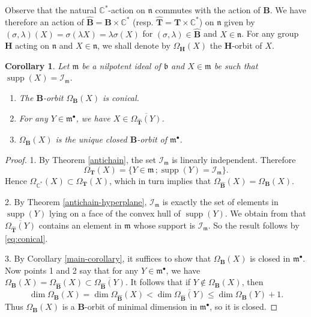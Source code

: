 \documentclass{amsart}
\newtheorem{corollary}[theorem]{Corollary}
\theoremstyle{definition}
\theoremstyle{remark}
\numberwithin{equation}{section}
\newcommand{\supp}{\mathop{\mathrm{supp}}\nolimits}
\newcommand{\soc}[1]{\mathcal{I}_{#1}}
\newcommand{\group}[1]{\mathbf{#1}}
\begin{document}
Observe that the natural $\mathbb{C}^{*}$-action on $\mathfrak{n}$
commutes with the action of $\group{B}$. We have therefore an action of 
$\widehat{\group{B}} = \group{B} \times \mathbb{C}^{*}$ 
(resp. $\widehat{\group{T}} = \group{T} \times \mathbb{C}^{*}$) 
on $\mathfrak{n}$ given by 
$(\sigma, \lambda ) (X) = \sigma (\lambda X) = \lambda \sigma (X)$
for $(\sigma, \lambda )\in \widehat{\group{B}}$ and $X\in\mathfrak{n}$.
For any group $\group{H}$ acting on $\mathfrak{n}$ and $X\in\mathfrak{n}$,
we shall denote by $\Omega_{\group{H}}(X)$ the $\group{H}$-orbit of $X$.

\begin{corollary}\label{description}
Let $\mathfrak{m}$ be a nilpotent ideal of $\mathfrak{b}$ and 
$X\in \mathfrak{m}$ be such that $\supp (X) = \soc{\mathfrak{m}}$.
\begin{enumerate}
\item The $\group{B}$-orbit $\Omega_{\group{B}}(X)$ is conical.
\item For any $Y\in\mathfrak{m}^{\bullet}$, we have
$X \in \overline{\Omega_{\widehat{\group{T}}} (Y)}$.
\item $\Omega_{\group{B}}(X)$ is the unique closed $\group{B}$-orbit of $\mathfrak{m}^{\bullet}$.
\end{enumerate}
\end{corollary}
\begin{proof}
1. By Theorem \ref{antichain}, the set $\soc{\mathfrak{m}}$ is linearly independent.
Therefore 
\begin{equation}\label{eq:conical}
\Omega_{\group{T}}(X) = \{ Y \in \mathfrak{m}\, ; \supp (Y) = \soc{\mathfrak{m}}\}.
\end{equation}
Hence $\Omega_{\mathbb{C}^{*}}( X )\subset \Omega_{\group{T}}(X)$, which in turn implies that 
$\Omega_{\widehat{\group{B}}} (X) = \Omega_{\group{B}}(X)$. 

2. By Theorem \ref{antichain-hyperplane}, $\soc{\mathfrak{m}}$ is exactly the set of elements in
$\supp (Y)$ lying on a face of the convex hull
of $\supp (Y)$. We obtain from \cite[Proposition 2.18]{C} that 
$\overline{\Omega_{\widehat{\group{T}}} (Y)}$ contains
an element in $\mathfrak{m}$ whose support is $\soc{\mathfrak{m}}$. 
So the result follows by \eqref{eq:conical}.

3. By Corollary \ref{main-corollary}, it suffices to show that $\Omega_{\group{B}} (X)$ is closed in 
$\mathfrak{m}^{\bullet}$. Now points 1 and 2 say that for any $Y\in\mathfrak{m}^{\bullet}$, we have
$
\Omega_{\group{B}}(X)  = \Omega_{\widehat{\group{B}}} (X) 
\subset  \overline{\Omega_{\widehat{\group{B}}} (Y)}.
$
It follows that if $Y\not\in \Omega_{\group{B}} (X)$, then 
$$
\dim \Omega_{\group{B}}(X) = \dim \Omega_{\widehat{\group{B}}} (X)
< \dim  \overline{\Omega_{\widehat{\group{B}}} (Y)} \leqslant \dim \Omega_{\group{B}}(Y) + 1.
$$
Thus $\Omega_{\group{B}}(X)$ is a $\group{B}$-orbit of minimal dimension in $\mathfrak{m}^{\bullet}$,
so it is closed.
\end{proof}
\end{document}
